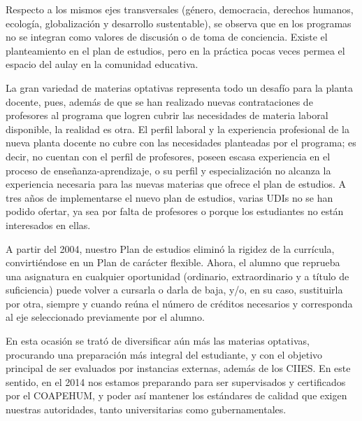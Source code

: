 Respecto a los mismos ejes transversales (género, democracia, derechos 
humanos, ecología, globalización y desarrollo sustentable), se observa 
que en los programas no se integran como valores de discusión o de toma 
de conciencia. Existe el planteamiento en el plan de estudios, pero en 
la práctica pocas veces permea el espacio del aula\linebreak y en la comunidad 
educativa.

La gran variedad de materias optativas representa todo un desafío para la 
planta docente, pues, además de que se han realizado nuevas 
contrataciones de profesores al programa que logren cubrir las 
necesidades de materia laboral disponible, la realidad es otra. El 
perfil laboral y la experiencia profesional de la nueva planta docente no 
cubre con las necesidades planteadas por el programa; es decir, no cuentan con 
el perfil de  profesores, poseen escasa experiencia en el proceso de 
enseñanza-aprendizaje, o su perfil y especialización no alcanza la 
experiencia necesaria para las nuevas materias que ofrece el plan de 
estudios. A tres años de implementarse el nuevo plan de estudios, varias 
UDIs no se han podido ofertar, ya sea por falta de profesores  o 
porque los estudiantes no están interesados en ellas.

A partir del 2004, nuestro Plan de estudios eliminó la rigidez de la 
currícula, convirtiéndose en un Plan de carácter flexible. Ahora, el alumno que reprueba 
una asignatura en cualquier oportunidad (ordinario, extraordinario y a 
título de suficiencia) puede volver a cursarla o darla de baja, y\slash{}o, en 
su caso, sustituirla por otra, siempre y cuando reúna el número de 
créditos necesarios y corresponda al eje seleccionado previamente por 
el alumno.

En esta ocasión se trató de diversificar aún más las materias optativas, 
procurando una preparación más integral del estudiante, y con el 
objetivo principal de ser evaluados por instancias externas, además de 
los CIIES. En este sentido, en el 2014 nos estamos preparando para 
ser supervisados y certificados por el COAPEHUM, y poder así mantener 
los estándares de calidad que exigen nuestras autoridades, tanto 
universitarias como gubernamentales.

